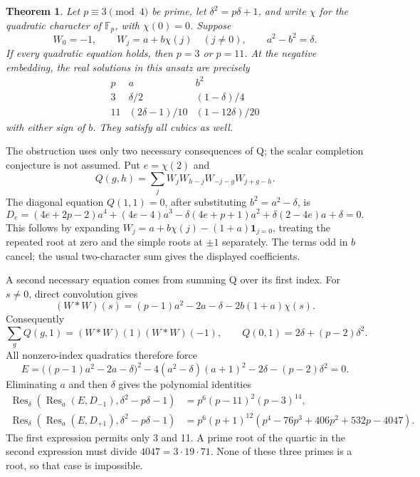 \documentclass[11pt,reqno]{amsart}
\theoremstyle{plain}
\newtheorem{theorem}{Theorem}[section]
\begin{document}
\begin{theorem}
Let \(p\equiv3\pmod4\) be prime, let
\(\delta^2=p\delta+1\), and write \(\chi\) for the quadratic character
of \(\mathbb F_p\), with \(\chi(0)=0\). Suppose
\begin{equation*}
 W_0=-1,\qquad W_j=a+b\chi(j)\quad(j\ne0),\qquad
 a^2-b^2=\delta.
 \tag{56.1}
\end{equation*}
If every quadratic equation holds, then \(p=3\) or \(p=11\).
At the negative embedding, the real solutions in this ansatz are precisely
\begin{equation*}
 \begin{array}{c|c|c}
 p&a&b^2\\ \hline
 3&\delta/2&(1-\delta)/4\\
 11&(2\delta-1)/10&(1-12\delta)/20
 \end{array}
 \tag{56.2}
\end{equation*}
with either sign of \(b\). They satisfy all cubics as well.
\end{theorem}

The obstruction uses only two necessary consequences of Q; the scalar
completion conjecture is not assumed. Put \(e=\chi(2)\) and
\[
 Q(g,h)=\sum_j W_jW_{h-j}W_{-j-g}W_{j+g-h}.
\]
The diagonal equation \(Q(1,1)=0\), after substituting
\(b^2=a^2-\delta\), is
\begin{equation*}
 D_e=(4e+2p-2)a^4+(4e-4)a^3
 -\delta(4e+p+1)a^2+\delta(2-4e)a+\delta=0.
 \tag{56.3}
\end{equation*}
This follows by expanding
\(W_j=a+b\chi(j)-(1+a)\mathbf1_{j=0}\), treating the repeated
root at zero and the simple roots at \(\pm1\) separately. The terms
odd in \(b\) cancel; the usual two-character sum gives the displayed
coefficients.

A second necessary equation comes from summing Q over its first index.
For \(s\ne0\), direct convolution gives
\[
 (W*W)(s)=(p-1)a^2-2a-\delta-2b(1+a)\chi(s).
\]
Consequently
\[
 \sum_g Q(g,1)=(W*W)(1)(W*W)(-1),\qquad
 Q(0,1)=2\delta+(p-2)\delta^2.
\]
All nonzero-index quadratics therefore force
\begin{equation*}
 E=\big((p-1)a^2-2a-\delta\big)^2
   -4(a^2-\delta)(a+1)^2-2\delta-(p-2)\delta^2=0.
 \tag{56.4}
\end{equation*}
Eliminating \(a\) and then \(\delta\) gives the polynomial identities
\begin{equation*}
 \begin{aligned}
 \operatorname{Res}_{\delta}\!\left(
  \operatorname{Res}_a(E,D_{-1}),\delta^2-p\delta-1\right)
  &=p^6(p-11)^2(p-3)^{14},\\
 \operatorname{Res}_{\delta}\!\left(
  \operatorname{Res}_a(E,D_{+1}),\delta^2-p\delta-1\right)
  &=p^6(p+1)^{12}
    (p^4-76p^3+406p^2+532p-4047).
 \end{aligned}\tag{56.5}
\end{equation*}
The first expression permits only 3 and 11. A prime root of the quartic
in the second expression must divide \(4047=3\cdot19\cdot71\).
None of these three primes is a root, so that case is impossible.
\end{document}
